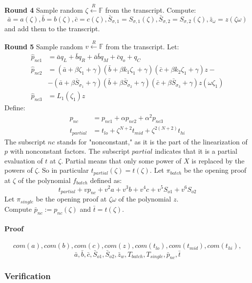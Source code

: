 \documentclass[../lecture-notes.tex]{subfiles}
\begin{document}
\textcolor{green!60!black}{\textbf{Round 4}} Sample random $\zeta \xleftarrow{R}
\mathbb{F}$ from the transcript. Compute:
\[\bar{a} = a(\zeta), \bar{b} = b(\zeta), \bar{c} = c(\zeta), \bar{S}_{\sigma,1} = S_{\sigma,1}(\zeta), \bar{S}_{\sigma,2} = S_{\sigma,2}(\zeta), \bar{z}_{\omega} = z(\zeta \omega)\]
and add them to the transcript.

\textcolor{green!60!black}{\textbf{Round 5}} Sample random $v \xleftarrow{R}
\mathbb{F}$ from the transcript. Let:
\begin{align*}
\hat{p}_{nc1} &= \bar{a}q_L + \bar{b}q_R + \bar{a}\bar{b}q_M + \bar{c}q_o + q_C \\
\hat{p}_{nc2} &= (\bar{a} + \beta \zeta_1 + \gamma)(\bar{b} + \beta k_1 \zeta_1 + \gamma)(\bar{c} + \beta k_2 \zeta_1 + \gamma) z -\\
&- (\bar{a} + \beta \bar{S}_{\sigma_1} + \gamma)(\bar{b} + \beta \bar{S}_{\sigma_2} + \gamma)(\bar{c} + \beta \bar{S}_{\sigma_3} + \gamma) z(\omega \zeta_1) \\
\hat{p}_{nc3} &= L_1(\zeta_1)z
\end{align*}
Define:
\begin{align*}
p_{nc} &= p_{nc1} + \alpha p_{nc2} + \alpha^2 p_{nc3} \\
t_{partial} &= t_{lo} + \zeta^{N+2}t_{mid} + \zeta^{2(N+2)}t_{hi}
\end{align*}
The subscript $nc$ stands for "nonconstant," as it is the part of the linearization of $p$ with nonconstant factors. The subscript $partial$ indicates that it is a partial evaluation of $t$ at $\zeta$. Partial means that only some power of $X$ is replaced by the powers of $\zeta$. So in particular $t_{partial}(\zeta) = t(\zeta)$.
Let $\pi_{batch}$ be the opening proof at $\zeta$ of the polynomial $f_{batch}$ defined as: 
\[t_{partial} + v p_{nc} + v^2 a + v^3 b + v^4 c + v^5 S_{o1} + v^6 S_{o2}\]
Let $\pi_{single}$ be the opening proof at $\zeta\omega$ of the polynomial $z$. \\
Compute $\bar{p}_{nc} := p_{nc}(\zeta)$ and $\bar{t} = t(\zeta)$.

\paragraph{Proof}
\[com(a), com(b), com(c), com(z), com(t_{lo}), com(t_{mid}), com(t_{hi}),\] 
\[\bar{a}, \bar{b}, \bar{c}, \bar{S}_{o1}, \bar{S}_{o2}, \bar{z}_w, T_{batch}, T_{single}, \bar{p}_{nc}, \bar{t}\]

\subsubsection{Verification}
\end{document}

